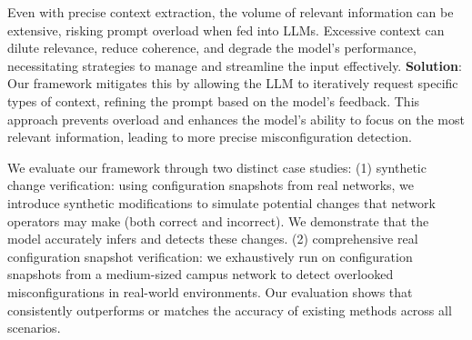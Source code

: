 Even with precise context extraction, the volume of relevant information can be extensive, risking prompt overload when fed into LLMs. Excessive context can dilute relevance, reduce coherence, and degrade the model’s performance, necessitating strategies to manage and streamline the input effectively. \textbf{Solution}: Our framework mitigates this by allowing the LLM to iteratively request specific types of context, refining the prompt based on the model’s feedback. This approach prevents overload and enhances the model’s ability to focus on the most relevant information, leading to more precise misconfiguration detection.

We evaluate our framework through two distinct case studies: (1) synthetic change verification: using configuration snapshots from real networks, we introduce synthetic modifications to simulate potential changes that network operators may make (both correct and incorrect). We demonstrate that the model accurately infers and detects these changes. (2) comprehensive real configuration snapshot verification: we exhaustively run \sysname{} on configuration snapshots from a medium-sized campus network to detect overlooked misconfigurations in real-world environments. Our evaluation shows that \sysname{} consistently outperforms or matches the accuracy of existing methods across all scenarios.